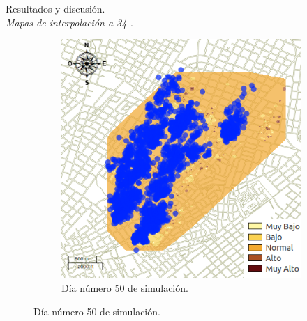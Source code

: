 \begin{frame}[t]{Resultados y discusión.\\\textit{Mapas de interpolación a 34 \textcelsius.}}
\begin{figure}
\begin{subfigure}[b]{0.45\textwidth}
        \includegraphics[width=\textwidth]{./graphics/temp-34-final.png}
        \caption{Día número 50 de simulación.}
    \end{subfigure}
    \end{figure}
\end{frame}
